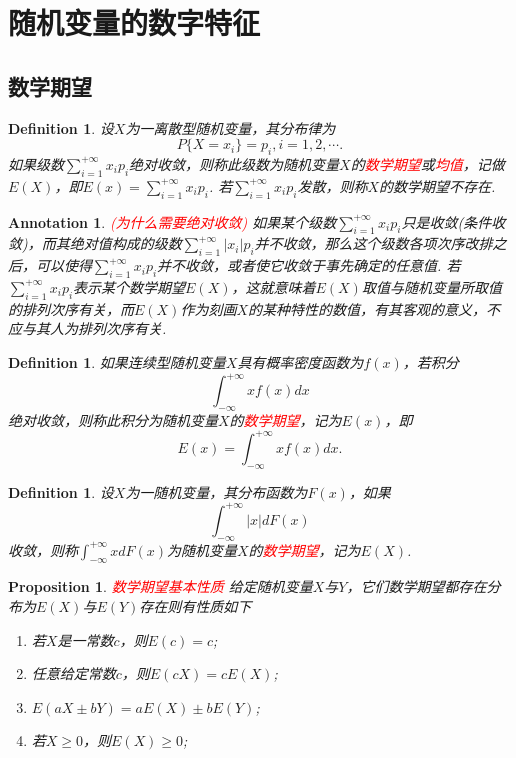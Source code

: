 \documentclass{article}
\newtheorem{proposition}[theorem]{Proposition}
\newtheorem{definition}[theorem]{Definition}
\newtheorem{annotation}[theorem]{Annotation}
\newcommand{\redt}[1]{\textcolor{red}{#1}}
\begin{document}
\newpage
\section{随机变量的数字特征}

\subsection{数学期望}

\begin{definition}
\rm 设$X$为一离散型随机变量，其分布律为
$$
P\{X=x_i\} = p_i, i= 1,2,\cdots.
$$
如果级数$\sum\limits_{i=1}^{+\infty}x_ip_i$绝对收敛，则称此级数为随机变量$X$的\redt{数学期望}或\redt{均值}，记做$E(X)$，即$E(x) = \sum\limits_{i=1}^{+\infty}x_ip_i$. 若$\sum\limits_{i=1}^{+\infty}x_ip_i$发散，则称$X$的数学期望不存在. 
\end{definition}

\begin{annotation}
\rm \redt{(为什么需要绝对收敛)} 如果某个级数$\sum\limits_{i=1}^{+\infty}x_ip_i$只是收敛(条件收敛)，而其绝对值构成的级数$\sum\limits_{i=1}^{+\infty}|x_i|p_i$并不收敛，那么这个级数各项次序改排之后，可以使得$\sum\limits_{i=1}^{+\infty}x_ip_i$并不收敛，或者使它收敛于事先确定的任意值. 若$\sum\limits_{i=1}^{+\infty}x_ip_i$表示某个数学期望$E(X)$，这就意味着$E(X)$取值与随机变量所取值的排列次序有关，而$E(X)$作为刻画$X$的某种特性的数值，有其客观的意义，不应与其人为排列次序有关.
\end{annotation}

\begin{definition}
\rm 如果连续型随机变量$X$具有概率密度函数为$f(x)$，若积分
$$
\int_{-\infty}^{+\infty} xf(x)dx
$$
绝对收敛，则称此积分为随机变量$X$的\redt{数学期望}，记为$E(x)$，即
$$
E(x) = \int_{-\infty}^{+\infty} xf(x)dx. 
$$
\end{definition}

\begin{definition}
\rm 设$X$为一随机变量，其分布函数为$F(x)$，如果
$$
\int_{-\infty}^{+\infty} |x|dF(x)
$$
收敛，则称$\int_{-\infty}^{+\infty} xdF(x)$为随机变量$X$的\redt{数学期望}，记为$E(X)$. 
\end{definition}

\begin{proposition}
\rm \redt{数学期望基本性质} 给定随机变量$X$与$Y$，它们数学期望都存在分布为$E(X)$与$E(Y)$存在则有性质如下
\begin{enumerate}
	\item 若$X$是一常数$c$，则$E(c) = c$;
	\item 任意给定常数$c$，则$E(cX) = cE(X)$;
	\item $E(aX \pm bY) = aE(X)\pm bE(Y)$;
	\item 若$X \geq 0$，则$E(X) \geq 0$;
\end{enumerate}
\end{proposition}
\end{document}
